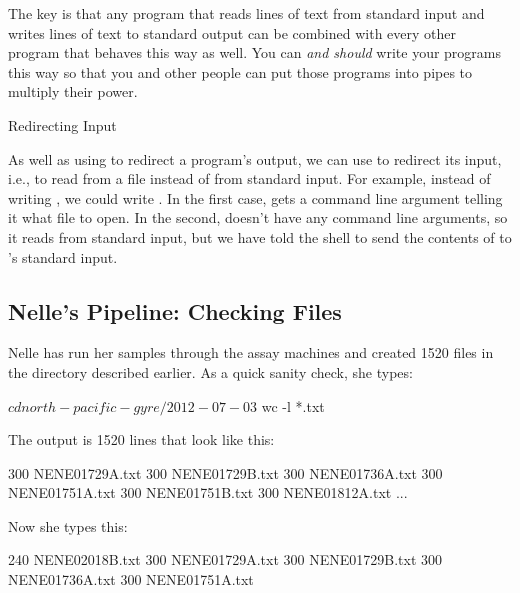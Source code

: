 The key is that any program that reads lines of text from standard input
and writes lines of text to standard output can be combined with every
other program that behaves this way as well. You can \emph{and should}
write your programs this way so that you and other people can put those
programs into pipes to multiply their power.

\begin{swcbox}{Redirecting Input}


As well as using \code{\textgreater{}} to redirect a program's output,
we can use \code{\textless{}} to redirect its input, i.e., to read
from a file instead of from standard input. For example, instead of
writing , we could write
. In the first case,  gets
a command line argument telling it what file to open. In the second,
 doesn't have any command line arguments, so it reads from
standard input, but we have told the shell to send the contents of
 to 's standard input.

\end{swcbox}

\subsection*{Nelle's Pipeline: Checking Files}

Nelle has run her samples through the assay machines and created 1520
files in the  directory described
earlier. As a quick sanity check, she types:

\begin{VerbIn}
$ cd north-pacific-gyre/2012-07-03
$ wc -l *.txt
\end{VerbIn}

\noindent
The output is 1520 lines that look like this:

\begin{VerbOut}
300 NENE01729A.txt
300 NENE01729B.txt
300 NENE01736A.txt
300 NENE01751A.txt
300 NENE01751B.txt
300 NENE01812A.txt
...
\end{VerbOut}

Now she types this:


\begin{VerbOut}
 240 NENE02018B.txt
 300 NENE01729A.txt
 300 NENE01729B.txt
 300 NENE01736A.txt
 300 NENE01751A.txt
\end{VerbOut}

